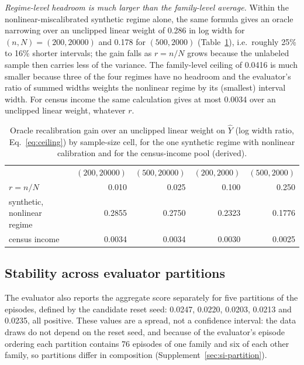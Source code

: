 \documentclass{article}
\begin{document}
\emph{Regime-level headroom is much larger than the family-level average.} Within the nonlinear-miscalibrated synthetic regime alone, the same formula gives an oracle narrowing over an unclipped linear weight of 0.286 in log width for $(n,N)=(200,20000)$ and 0.178 for $(500,2000)$ (Table~\ref{tab:rsens}), i.e.\ roughly 25\% to 16\% shorter intervals; the gain falls as $r=n/N$ grows because the unlabeled sample then carries less of the variance. The family-level ceiling of 0.0416 is much smaller because three of the four regimes have no headroom and the evaluator's ratio of summed widths weights the nonlinear regime by its (smallest) interval width. For census income the same calculation gives at most 0.0034 over an unclipped linear weight, whatever $r$. %

\begin{table}[t]
\centering
\caption{Oracle recalibration gain over an unclipped linear weight on $\hat Y$ (log width ratio, Eq.~\eqref{eq:ceiling}) by sample-size cell, for the one synthetic regime with nonlinear calibration and for the census-income pool (derived).}
\label{tab:rsens}
\small
\begin{tabular}{lrrrr}
\toprule
 & $(200,20000)$ & $(500,20000)$ & $(200,2000)$ & $(500,2000)$ \\
$r=n/N$ & 0.010 & 0.025 & 0.100 & 0.250 \\
\midrule
synthetic, nonlinear regime & 0.2855 & 0.2750 & 0.2323 & 0.1776 \\
census income & 0.0034 & 0.0034 & 0.0030 & 0.0025 \\
\bottomrule
\end{tabular}
\end{table}

\subsection{Stability across evaluator partitions}
The evaluator also reports the aggregate score separately for five partitions of the episodes, defined by the candidate reset seed: 0.0247, 0.0220, 0.0203, 0.0213 and 0.0235, all positive. %
These values are a spread, not a confidence interval: the data draws do not depend on the reset seed, and because of the evaluator's episode ordering each partition contains 76 episodes of one family and six of each other family, so partitions differ in composition (Supplement~\ref{sec:si-partition}). %
\end{document}
